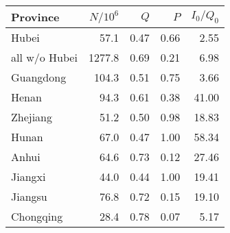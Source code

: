 \begin{tabular}{lrrrr}
\hline
 Province      &   $N/10^6$ &   $Q$ &   $P$ &   $I_0/Q_0$ \\
\hline
 Hubei         &       57.1 &  0.47 &  0.66 &        2.55 \\
 all w/o Hubei &     1277.8 &  0.69 &  0.21 &        6.98 \\
 Guangdong     &      104.3 &  0.51 &  0.75 &        3.66 \\
 Henan         &       94.3 &  0.61 &  0.38 &       41.00 \\
 Zhejiang      &       51.2 &  0.50 &  0.98 &       18.83 \\
 Hunan         &       67.0 &  0.47 &  1.00 &       58.34 \\
 Anhui         &       64.6 &  0.73 &  0.12 &       27.46 \\
 Jiangxi       &       44.0 &  0.44 &  1.00 &       19.41 \\
 Jiangsu       &       76.8 &  0.72 &  0.15 &       19.10 \\
 Chongqing     &       28.4 &  0.78 &  0.07 &        5.17 \\
\hline
\end{tabular}